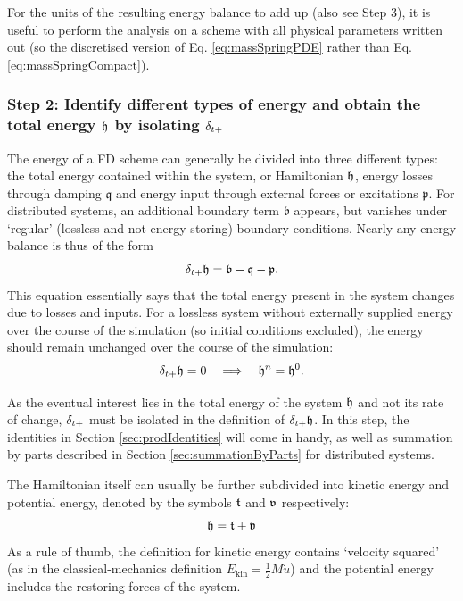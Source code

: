 {{For the units of the resulting energy balance to add up (also see Step 3), it is useful to perform the analysis on a scheme with all physical parameters written out (so the discretised version of Eq. \eqref{eq:massSpringPDE} rather than Eq. \eqref{eq:massSpringCompact}).

\subsubsection{Step 2: Identify different types of energy and obtain the total energy $\mathfrak{h}$ by isolating $\delta_{t+}$}
The energy of a FD scheme can generally be divided into three different types: the total energy contained within the system, or Hamiltonian $\mathfrak{h}$, energy losses through damping $\mathfrak{q}$ and energy input through external forces or excitations $\mathfrak{p}$. For distributed systems, an additional boundary term $\mathfrak{b}$ appears, but vanishes under `regular' (lossless and not energy-storing) boundary conditions. Nearly any energy balance is thus of the form 
\begin{equation}\label{eq:energyForm}
    \delta_{t+} \mathfrak{h} = \mathfrak{b}-\mathfrak{q} - \mathfrak{p}.
\end{equation}
This equation essentially says that the total energy present in the system changes due to losses and inputs. For a lossless system without externally supplied energy over the course of the simulation (so initial conditions excluded), the energy should remain unchanged over the course of the simulation:
\begin{equation}\label{eq:unchangedEnergy}
    \delta_{t+} \mathfrak{h} = 0 \quad \Longrightarrow \quad \mathfrak{h}^n = \mathfrak{h}^0.
\end{equation}

As the eventual interest lies in the total energy of the system $\mathfrak{h}$ and not its rate of change, $\delta_{t+}$ must be isolated in the definition of $\delta_{t+} \mathfrak{h}$. In this step, the identities in Section \ref{sec:prodIdentities} will come in handy, as well as summation by parts described in Section \ref{sec:summationByParts} for distributed systems.
 
The Hamiltonian itself can usually be further subdivided into kinetic energy and potential energy, denoted by the symbols $\mathfrak{t}$ and $\mathfrak{v}$ respectively:
\begin{equation}
    \mathfrak{h} = \mathfrak{t} + \mathfrak{v}
\end{equation}
As a rule of thumb, the definition for kinetic energy contains `velocity squared' (as in the classical-mechanics definition $E_\text{kin}=\tfrac{1}{2}M\dot u$) and the potential energy includes the restoring forces of the system. 

}}
